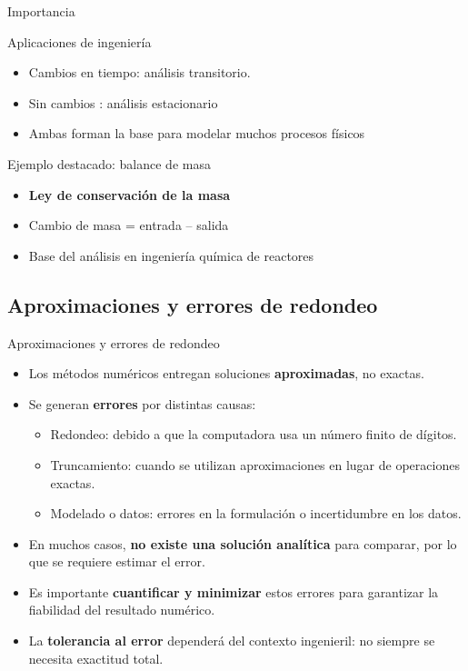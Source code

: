 \documentclass[main.tex]{subfiles}
\begin{document}
\begin{frame}[c]{Importancia }
\begin{block}{Aplicaciones de ingeniería}
\begin{itemize}
  \item Cambios en tiempo: análisis transitorio.
  \item Sin cambios : análisis estacionario
  \item Ambas forman la base para modelar muchos procesos físicos
\end{itemize}
\end{block}

\begin{block}{Ejemplo destacado: balance de masa}
\begin{itemize}
  \item \textbf{Ley de conservación de la masa}
  \item Cambio de masa = entrada – salida
  \item Base del análisis en ingeniería química de reactores
\end{itemize}
\end{block}
\end{frame}

\subsection{Aproximaciones y errores de redondeo}
\begin{frame}[c]{Aproximaciones y errores de redondeo}
\begin{itemize}
  \item Los métodos numéricos entregan soluciones \textbf{aproximadas}, no exactas.
  \item Se generan \textbf{errores} por distintas causas:
  \begin{itemize}
    \item Redondeo: debido a que la computadora usa un número finito de dígitos.
    \item Truncamiento: cuando se utilizan aproximaciones en lugar de operaciones exactas.
    \item Modelado o datos: errores en la formulación o incertidumbre en los datos.
  \end{itemize}
  \item En muchos casos, \textbf{no existe una solución analítica} para comparar, por lo que se requiere estimar el error.
  \item Es importante \textbf{cuantificar y minimizar} estos errores para garantizar la fiabilidad del resultado numérico.
  \item La \textbf{tolerancia al error} dependerá del contexto ingenieril: no siempre se necesita exactitud total.
\end{itemize}
\end{frame}
\end{document}
